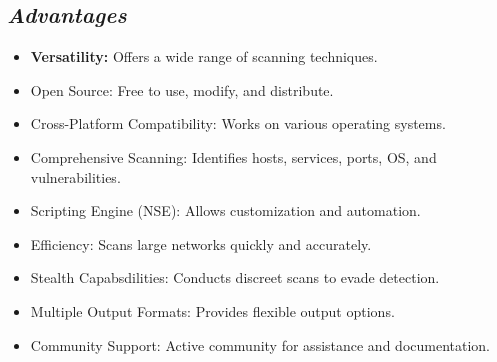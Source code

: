 \documentclass{article}
\begin{document}
\subsection{\textit{Advantages}}
\begin{itemize}
    \item \textbf{Versatility:} Offers a wide range of scanning techniques.
    \item Open Source: Free to use, modify, and distribute.
    \item Cross-Platform Compatibility: Works on various operating systems.
    \item Comprehensive Scanning: Identifies hosts, services, ports, OS, and vulnerabilities.
    \item Scripting Engine (NSE): Allows customization and automation.
    \item Efficiency: Scans large networks quickly and accurately.
    \item Stealth Capabsdilities: Conducts discreet scans to evade detection.
    \item Multiple Output Formats: Provides flexible output options.
    \item Community Support: Active community for assistance and documentation.
\end{itemize}
\end{document}
